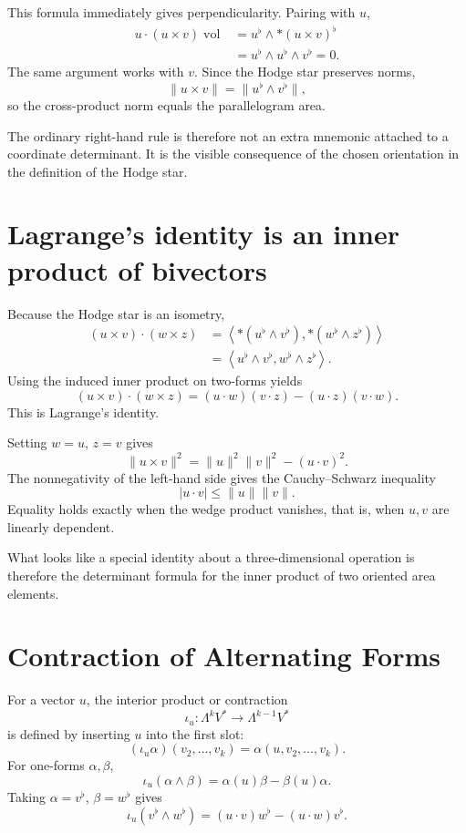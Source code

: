 This formula immediately gives perpendicularity.  Pairing with \(u\),
\[
\begin{aligned}
  u\cdot(u\times v)\operatorname{vol}
  &=u^{\flat}\wedge*(u\times v)^{\flat}\\
  &=u^{\flat}\wedge u^{\flat}\wedge v^{\flat}=0.
\end{aligned}
\]
The same argument works with \(v\).  Since the Hodge star preserves norms,
\[
  \|u\times v\|
  =\|u^{\flat}\wedge v^{\flat}\|,
\]
so the cross-product norm equals the parallelogram area.

The ordinary right-hand rule is therefore not an extra mnemonic attached to a coordinate determinant.  It is the visible consequence of the chosen orientation in the definition of the Hodge star.

\section{Lagrange's identity is an inner product of bivectors}

Because the Hodge star is an isometry,
\[
\begin{aligned}
  (u\times v)\cdot(w\times z)
  &=\left\langle
  *(u^{\flat}\wedge v^{\flat}),
  *(w^{\flat}\wedge z^{\flat})
  \right\rangle\\
  &=\left\langle
  u^{\flat}\wedge v^{\flat},
  w^{\flat}\wedge z^{\flat}
  \right\rangle.
\end{aligned}
\]
Using the induced inner product on two-forms yields
\[
  \boxed{
  (u\times v)\cdot(w\times z)
  =(u\cdot w)(v\cdot z)
  -(u\cdot z)(v\cdot w).}
\]
This is Lagrange's identity.

Setting \(w=u\), \(z=v\) gives
\[
  \|u\times v\|^2
  =\|u\|^2\|v\|^2-(u\cdot v)^2.
\]
The nonnegativity of the left-hand side gives the Cauchy--Schwarz inequality
\[
  |u\cdot v|\le\|u\|\|v\|.
\]
Equality holds exactly when the wedge product vanishes, that is, when \(u,v\) are linearly dependent.

What looks like a special identity about a three-dimensional operation is therefore the determinant formula for the inner product of two oriented area elements.

\section{Contraction of Alternating Forms}

For a vector \(u\), the interior product or contraction
\[
  \iota_u:\Lambda^kV^*\to\Lambda^{k-1}V^*
\]
is defined by inserting \(u\) into the first slot:
\[
  (\iota_u\alpha)(v_2,\ldots,v_k)
  =\alpha(u,v_2,\ldots,v_k).
\]
For one-forms \(\alpha,\beta\),
\[
  \iota_u(\alpha\wedge\beta)
  =\alpha(u)\beta-\beta(u)\alpha.
\]
Taking \(\alpha=v^{\flat}\), \(\beta=w^{\flat}\) gives
\[
  \iota_u(v^{\flat}\wedge w^{\flat})
  =(u\cdot v)w^{\flat}-(u\cdot w)v^{\flat}.
\]

